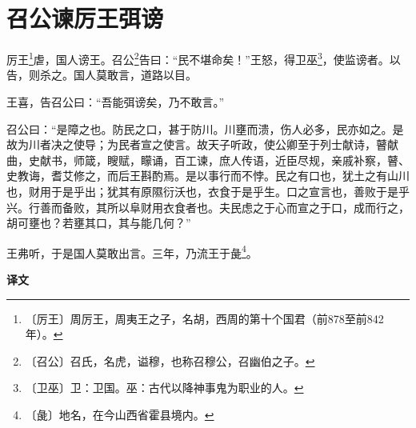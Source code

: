 \documentclass[12pt,UTF-8,openany,a4]{ctexbook}
\begin{document}
\chapter{召公谏厉王弭谤}

\begin{large}
    
    厉王\footnote{〔厉王〕\yiwen 周厉王，周夷王之子，名胡，西周的第十个国君（前878至前842年）。}虐，国人谤王。召公\footnote{〔召公〕\yiwen 召氏，名虎，谥穆，也称召穆公，召幽伯之子。}告曰：“民不堪命矣！”王怒，得卫巫\footnote{〔卫巫〕\yiwen 卫：卫国。巫：古代以降神事鬼为职业的人。}，使监谤者。以告，则杀之。国人莫敢言，道路以目。
    
    王喜，告召公曰：“吾能弭谤矣，乃不敢言。”
    
    召公曰：“是障之也。防民之口，甚于防川。川壅而溃，伤人必多，民亦如之。是故为川者决之使导；为民者宣之使言。故天子听政，使公卿至于列士献诗，瞽献曲，史献书，师箴，瞍赋，矇诵，百工谏，庶人传语，近臣尽规，亲戚补察，瞽、史教诲，耆艾修之，而后王斟酌焉。是以事行而不悖。民之有口也，犹土之有山川也，财用于是乎出；犹其有原隰衍沃也，衣食于是乎生。口之宣言也，善败于是乎兴。行善而备败，其所以阜财用衣食者也。夫民虑之于心而宣之于口，成而行之，胡可壅也？若壅其口，其与能几何？”
    
    王弗听，于是国人莫敢出言。三年，乃流王于彘\footnote{〔彘〕\yiwen 地名，在今山西省霍县境内。}。
\end{large}


\newpage

\begin{Large}
    \noindent\textbf{译文}
\end{Large}


\vspace{1em}
\end{document}
